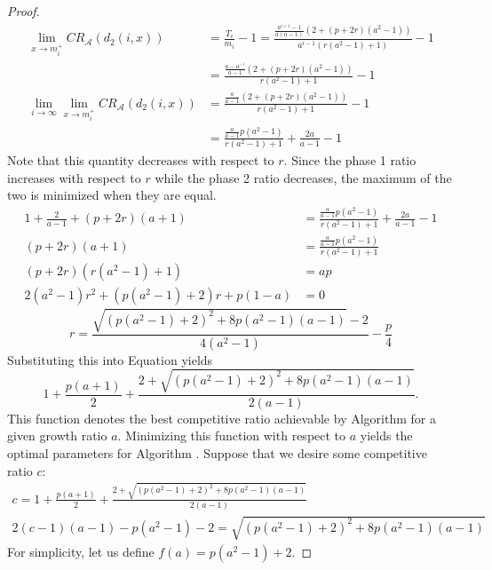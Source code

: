 \begin{proof}
  \begin{align*}
    \lim_{x\to m_i^+}CR_{\mathcal{A}}(d_2(i,x)) &= \frac{T_i}{m_i} - 1 
    = \frac{\frac{a^{i+1}-1}{a(a-1)}\left(2 + (p+2r)\left(a^2-1\right)\right)}{a^{i-1}\left(r(a^2-1)+1\right)} - 1 \\
    &= \frac{\frac{a-a^{-i}}{a-1}\left(2 + (p+2r)\left(a^2-1\right)\right)}{r(a^2-1)+1} - 1 \\
    \lim_{i\to \infty}\lim_{x\to m_i^+}CR_{\mathcal{A}}(d_2(i,x)) &= \frac{\frac{a}{a-1}\left(2 + (p+2r)\left(a^2-1\right)\right)}{r(a^2-1)+1} - 1 \\
    &= \frac{\frac{a}{a-1}p\left(a^2-1\right)}{r(a^2-1)+1} + \frac{2a}{a-1} - 1
  \end{align*}
  Note that this quantity decreases with respect to $r$.
  Since the phase 1 ratio increases with respect to $r$ while the phase 2 ratio decreases, the maximum of the two is minimized when they are equal.
  \begin{align*}
    1 + \frac{2}{a-1} + (p+2r)(a+1) &= \frac{\frac{a}{a-1}p\left(a^2-1\right)}{r(a^2-1)+1} + \frac{2a}{a-1} - 1 \\
    (p+2r)(a+1) &= \frac{\frac{a}{a-1}p\left(a^2-1\right)}{r(a^2-1)+1} \\
    (p+2r)\left(r(a^2-1)+1\right) &= ap \\
    2(a^2-1)r^2 + \left(p(a^2-1)+2\right)r + p(1-a) &= 0
  \end{align*}
  \begin{equation*}
    r = \frac{\sqrt{\left(p(a^2-1)+2\right)^2+8p(a^2-1)(a-1)}-2}{4(a^2-1)}-\frac{p}{4}
  \end{equation*}
  Substituting this into Equation  yields
  \begin{equation*}
    1 + \frac{p(a+1)}{2}+\frac{2+\sqrt{\left(p(a^2-1)+2\right)^2+8p(a^2-1)(a-1)}}{2(a-1)} .
  \end{equation*}
  This function denotes the best competitive ratio achievable by Algorithm  for a given growth ratio $a$. Minimizing this function with respect to $a$ yields the optimal parameters for Algorithm . Suppose that we desire some competitive ratio $c$:
  \begin{align*}
    c = 1 + \frac{p(a+1)}{2}+\frac{2+\sqrt{\left(p(a^2-1)+2\right)^2+8p(a^2-1)(a-1)}}{2(a-1)} \\
    2(c-1)(a-1) - p(a^2-1) - 2 = \sqrt{\left(p(a^2-1)+2\right)^2+8p(a^2-1)(a-1)}
  \end{align*}
  For simplicity, let us define $f(a)=p(a^2-1)+2$.

\end{proof}
